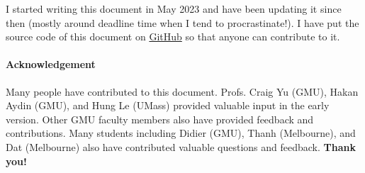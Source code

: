 \documentclass[11pt]{article}
\newcommand{\mycomment}[3][\color{blue}]{{#1{{#2}: {#3}}}}
\newcommand{\didi}[1]{\mycomment{Didier}{#1}}{}
\begin{document}
I started writing this document in May 2023 and have been updating it since then (mostly around deadline time when I tend to procrastinate!). I have put the source code of this document on \href{https://github.com/nguyenthanhvuh/phd-cs-us}{GitHub} so that anyone can contribute to it.  

\paragraph{Acknowledgement} Many people have contributed to this document.
Profs. Craig Yu (GMU), Hakan Aydin (GMU), and Hung Le (UMass) provided valuable input in the early version. Other GMU faculty members also have provided feedback and contributions.  Many students including Didier (GMU), Thanh (Melbourne), and Dat (Melbourne) also have contributed valuable questions and feedback. 
\textbf{Thank you!}






\end{document}

